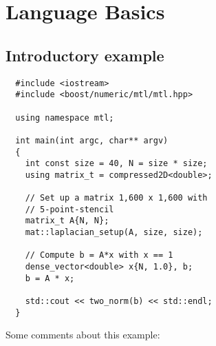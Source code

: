 \chapter{Language Basics\label{sec:basics}}
\section{Introductory example\label{sec:introductory-example}}

\begin{verbatim}
  #include <iostream>
  #include <boost/numeric/mtl/mtl.hpp>

  using namespace mtl;

  int main(int argc, char** argv)
  {
    int const size = 40, N = size * size;
    using matrix_t = compressed2D<double>;

    // Set up a matrix 1,600 x 1,600 with
    // 5-point-stencil
    matrix_t A{N, N};
    mat::laplacian_setup(A, size, size);

    // Compute b = A*x with x == 1
    dense_vector<double> x{N, 1.0}, b;
    b = A * x;

    std::cout << two_norm(b) << std::endl;
  }
\end{verbatim}

Some comments about this example:

